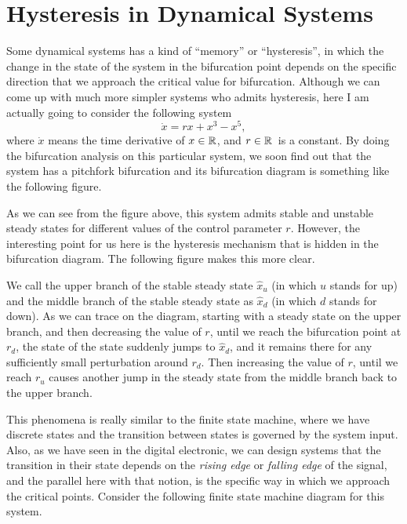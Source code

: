 \documentclass[12pt]{article}
\begin{document}
\section{Hysteresis in Dynamical Systems}
Some dynamical systems has a kind of ``memory'' or ``hysteresis'', in which the change in the state of the system in the bifurcation point depends on the specific direction that we approach the critical value for bifurcation. Although we can come up with much more simpler systems who admits hysteresis, here I am actually going to consider the following system
\[ \dot{x}= rx + x^3 - x^5, \]
where $\dot{x}$ means the time derivative of $x\in \mathbb{R}$, and $r\in\mathbb{R}$\ is a constant. By doing the bifurcation analysis on this particular system, we soon find out that the system has a pitchfork bifurcation and its bifurcation diagram is something like the following figure.


As we can see from the figure above, this system admits stable and unstable steady states for different values of the control parameter $r$. However, the interesting point for us here is the hysteresis mechanism that is hidden in the bifurcation diagram. The following figure makes this more clear. 



We call the upper branch of the stable steady state $\hat{x}_u$ (in which $u$ stands for up) and the middle branch of the stable steady state as $\hat{x}_d$ (in which $d$ stands for down). As we can trace on the diagram, starting with a steady state on the upper branch, and then decreasing the value of $r$, until we reach the bifurcation point at $r_d$, the state of the state suddenly jumps to $\hat{x}_d$, and it remains there for any sufficiently small perturbation around $r_d$. Then increasing the value of $r$, until we reach $r_u$ causes another jump in the steady state from the middle branch back to the upper branch. 

This phenomena is really similar to the finite state machine, where we have discrete states and the transition between states is governed by the system input. Also, as we have seen in the digital electronic, we can design systems that the transition in their state depends on the \emph{rising edge} or \emph{falling edge} of the signal, and the parallel here with that notion, is the specific way in which we approach the critical points. Consider the following finite state machine diagram for this system.

\end{document}
